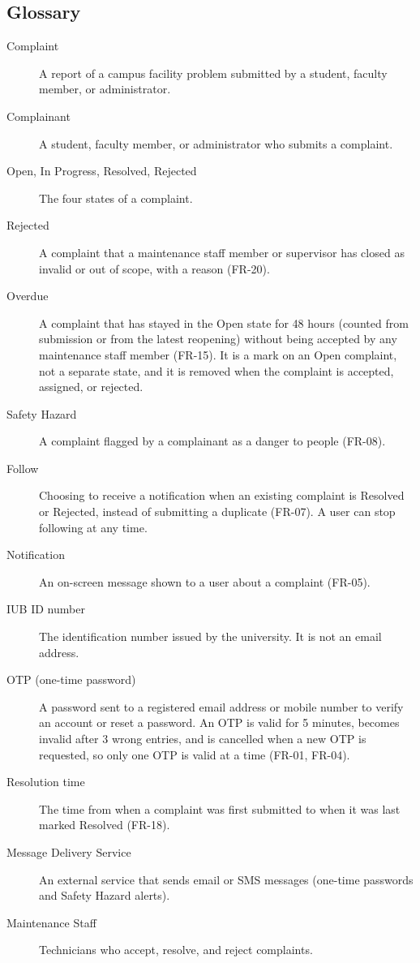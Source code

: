\begin{appendices}
\chapter{Glossary}
\begin{description}
  \item[Complaint] A report of a campus facility problem submitted by a student, faculty member, or administrator.
  \item[Complainant] A student, faculty member, or administrator who submits a complaint.
  \item[Open, In Progress, Resolved, Rejected] The four states of a complaint.
  \item[Rejected] A complaint that a maintenance staff member or supervisor has closed as invalid or out of scope, with a reason (FR-20).
  \item[Overdue] A complaint that has stayed in the Open state for 48 hours (counted from submission or from the latest reopening) without being accepted by any maintenance staff member (FR-15). It is a mark on an Open complaint, not a separate state, and it is removed when the complaint is accepted, assigned, or rejected.
  \item[Safety Hazard] A complaint flagged by a complainant as a danger to people (FR-08).
  \item[Follow] Choosing to receive a notification when an existing complaint is Resolved or Rejected, instead of submitting a duplicate (FR-07). A user can stop following at any time.
  \item[Notification] An on-screen message shown to a user about a complaint (FR-05).
  \item[IUB ID number] The identification number issued by the university. It is not an email address.
  \item[OTP (one-time password)] A password sent to a registered email address or mobile number to verify an account or reset a password. An OTP is valid for 5 minutes, becomes invalid after 3 wrong entries, and is cancelled when a new OTP is requested, so only one OTP is valid at a time (FR-01, FR-04).
  \item[Resolution time] The time from when a complaint was first submitted to when it was last marked Resolved (FR-18).
  \item[Message Delivery Service] An external service that sends email or SMS messages (one-time passwords and Safety Hazard alerts).
  \item[Maintenance Staff] Technicians who accept, resolve, and reject complaints.

\end{description}
\end{appendices}
